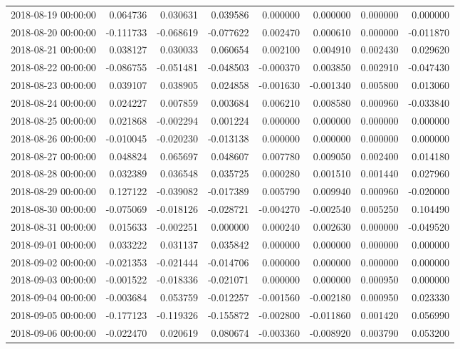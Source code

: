 \begin{tabular}{lrrrrrrr}
2018-08-19 00:00:00 & 0.064736 & 0.030631 & 0.039586 & 0.000000 & 0.000000 & 0.000000 & 0.000000 \\
2018-08-20 00:00:00 & -0.111733 & -0.068619 & -0.077622 & 0.002470 & 0.000610 & 0.000000 & -0.011870 \\
2018-08-21 00:00:00 & 0.038127 & 0.030033 & 0.060654 & 0.002100 & 0.004910 & 0.002430 & 0.029620 \\
2018-08-22 00:00:00 & -0.086755 & -0.051481 & -0.048503 & -0.000370 & 0.003850 & 0.002910 & -0.047430 \\
2018-08-23 00:00:00 & 0.039107 & 0.038905 & 0.024858 & -0.001630 & -0.001340 & 0.005800 & 0.013060 \\
2018-08-24 00:00:00 & 0.024227 & 0.007859 & 0.003684 & 0.006210 & 0.008580 & 0.000960 & -0.033840 \\
2018-08-25 00:00:00 & 0.021868 & -0.002294 & 0.001224 & 0.000000 & 0.000000 & 0.000000 & 0.000000 \\
2018-08-26 00:00:00 & -0.010045 & -0.020230 & -0.013138 & 0.000000 & 0.000000 & 0.000000 & 0.000000 \\
2018-08-27 00:00:00 & 0.048824 & 0.065697 & 0.048607 & 0.007780 & 0.009050 & 0.002400 & 0.014180 \\
2018-08-28 00:00:00 & 0.032389 & 0.036548 & 0.035725 & 0.000280 & 0.001510 & 0.001440 & 0.027960 \\
2018-08-29 00:00:00 & 0.127122 & -0.039082 & -0.017389 & 0.005790 & 0.009940 & 0.000960 & -0.020000 \\
2018-08-30 00:00:00 & -0.075069 & -0.018126 & -0.028721 & -0.004270 & -0.002540 & 0.005250 & 0.104490 \\
2018-08-31 00:00:00 & 0.015633 & -0.002251 & 0.000000 & 0.000240 & 0.002630 & 0.000000 & -0.049520 \\
2018-09-01 00:00:00 & 0.033222 & 0.031137 & 0.035842 & 0.000000 & 0.000000 & 0.000000 & 0.000000 \\
2018-09-02 00:00:00 & -0.021353 & -0.021444 & -0.014706 & 0.000000 & 0.000000 & 0.000000 & 0.000000 \\
2018-09-03 00:00:00 & -0.001522 & -0.018336 & -0.021071 & 0.000000 & 0.000000 & 0.000950 & 0.000000 \\
2018-09-04 00:00:00 & -0.003684 & 0.053759 & -0.012257 & -0.001560 & -0.002180 & 0.000950 & 0.023330 \\
2018-09-05 00:00:00 & -0.177123 & -0.119326 & -0.155872 & -0.002800 & -0.011860 & 0.001420 & 0.056990 \\
2018-09-06 00:00:00 & -0.022470 & 0.020619 & 0.080674 & -0.003360 & -0.008920 & 0.003790 & 0.053200 \\

\end{tabular}
